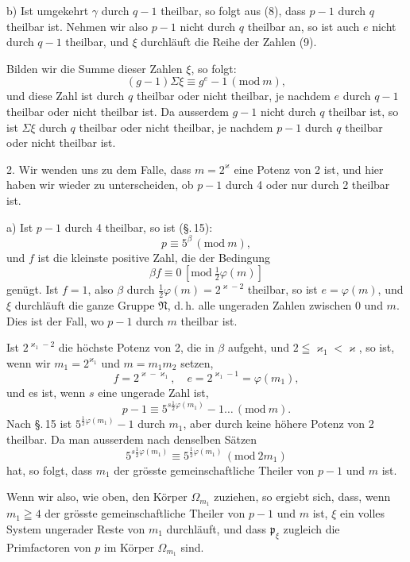 b) Ist umgekehrt $\gamma$ durch $q-1$ theilbar, so folgt aus (8), dass $p-1$ durch $q$ theilbar ist. Nehmen wir also $p-1$ nicht durch $q$ theilbar an, so ist auch $e$ nicht durch $q-1$ theilbar, und $\xi$ durchläuft die Reihe der Zahlen (9).

Bilden wir die Summe dieser Zahlen $\xi$, so folgt:
\[ (g-1) \Sigma \xi \equiv g^e - 1 \, (\mathrm{mod}\ m), \]
und diese Zahl ist durch $q$ theilbar oder nicht theilbar, je nachdem $e$ durch $q-1$ theilbar oder nicht theilbar ist. Da ausserdem $g-1$ nicht durch $q$ theilbar ist, so ist $\Sigma\xi$ durch $q$ theilbar oder nicht theilbar, je nachdem $p-1$ durch $q$ theilbar oder nicht theilbar ist.

2. Wir wenden uns zu dem Falle, dass $m = 2^\varkappa$ eine Potenz von 2 ist, und hier haben wir wieder zu unterscheiden, ob $p-1$ durch 4 oder nur durch 2 theilbar ist.

a) Ist $p-1$ durch 4 theilbar, so ist (\S.\,15):
\[ p \equiv 5^\beta \, (\mathrm{mod}\ m), \]
und $f$ ist die kleinste positive Zahl, die der Bedingung
\[ \beta f \equiv 0 \, [\mathrm{mod}\ \tfrac{1}{2}\varphi(m)] \]
genügt. Ist $f=1$, also $\beta$ durch $\tfrac{1}{2}\varphi(m) = 2^{\varkappa-2}$ theilbar, so ist $e = \varphi(m)$, und $\xi$ durchläuft die ganze Gruppe $\mathfrak{N}$, d.\,h. alle ungeraden Zahlen zwischen 0 und $m$. Dies ist der Fall, wo $p-1$ durch $m$ theilbar ist.

Ist $2^{\varkappa_1-2}$ die höchste Potenz von 2, die in $\beta$ aufgeht, und $2 \leqq \varkappa_1 < \varkappa$, so ist, wenn wir $m_1 = 2^{\varkappa_1}$ und $m = m_1 m_2$ setzen,
\[ f = 2^{\varkappa - \varkappa_1}, \quad e = 2^{\varkappa_1 - 1} = \varphi(m_1), \]
und es ist, wenn $s$ eine ungerade Zahl ist,
\[ p - 1 \equiv 5^{s\tfrac{1}{2}\varphi(m_1)} - 1 \ldots \, (\mathrm{mod}\ m). \]
Nach \S.\,15 ist $5^{\tfrac{1}{2}\varphi(m_1)} - 1$ durch $m_1$, aber durch keine höhere Potenz von 2 theilbar. Da man ausserdem nach denselben Sätzen
\[ 5^{s\tfrac{1}{2}\varphi(m_1)} \equiv 5^{\tfrac{1}{2}\varphi(m_1)} \, (\mathrm{mod}\ 2m_1) \]
hat, so folgt, dass $m_1$ der grösste gemeinschaftliche Theiler von $p-1$ und $m$ ist.

Wenn wir also, wie oben, den Körper $\Omega_{m_1}$ zuziehen, so ergiebt sich, dass, wenn $m_1 \geqq 4$ der grösste gemeinschaftliche Theiler von $p-1$ und $m$ ist, $\xi$ ein volles System ungerader Reste von $m_1$ durchläuft, und dass $\mathfrak{p}_\xi$ zugleich die Primfactoren von $p$ im Körper $\Omega_{m_1}$ sind.
